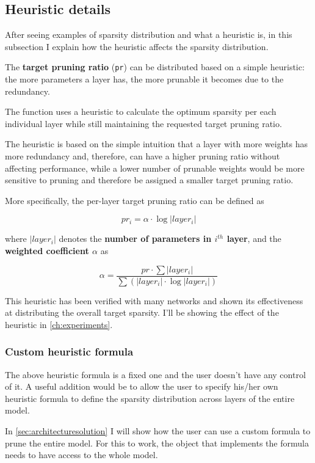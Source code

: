 \subsection{Heuristic details}
After seeing examples of sparsity distribution and what a heuristic is, in this
subsection I explain how the heuristic affects the sparsity distribution.

The \textbf{target pruning ratio} (\texttt{pr}) can be distributed based on a
simple heuristic: the more parameters a layer has, the more prunable it becomes
due to the redundancy.

The function uses a heuristic to calculate the optimum sparsity per each
individual layer while still maintaining the requested target pruning ratio.

The heuristic is based on the simple intuition that a layer with more weights
has more redundancy and, therefore, can have a higher pruning ratio without
affecting performance, while a lower number of prunable weights would be more
sensitive to pruning and therefore be assigned a smaller target pruning ratio.

More specifically, the per-layer target pruning ratio can be defined as

\begin{equation}
    pr_i = \alpha \cdot \log|layer_i|
\end{equation}

where $|layer_i|$ denotes the \textbf{number of parameters in $i^{th}$ layer},
and the \textbf{weighted coefficient $\alpha$} as

\begin{equation}
    \alpha = \frac{pr \cdot \sum|layer_i|}{\sum(|layer_i| \cdot \log|layer_i|)}
\end{equation}

This heuristic has been verified with many networks and shown its effectiveness
at distributing the overall target sparsity. I'll be showing the effect of the
heuristic in \autoref{ch:experiments}.

\subsubsection{Custom heuristic formula}
The above heuristic formula is a fixed one and the user doesn't have any
control of it. A useful addition would be to allow the user to specify his/her
own heuristic formula to define the sparsity distribution across layers of the
entire model.

In \autoref{sec:architecturesolution} I will show how the user can use a custom
formula to prune the entire model. For this to work, the object that implements
the formula needs to have access to the whole model.

